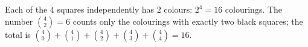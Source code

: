 Each of the $4$ squares independently has $2$ colours: $2^4=\boxed{16}$ colourings. The number $\binom42=6$ counts only the colourings with exactly two black squares; the total is $\binom40+\binom41+\binom42+\binom43+\binom44=16$.
